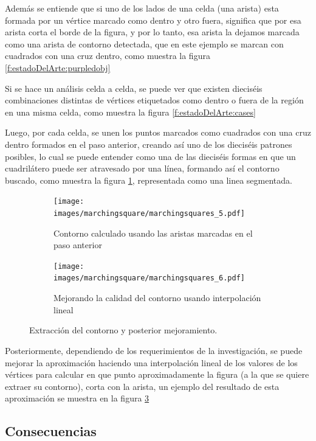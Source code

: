Además se entiende que si uno de los lados de una celda (una arista) esta formada por un
vértice marcado como dentro y otro fuera, significa que por esa arista corta el borde de la figura,
y por lo tanto, esa arista la dejamos marcada como una arista de contorno detectada, que en este
ejemplo se marcan con cuadrados con una cruz dentro, como muestra la figura \ref{f:estadoDelArte:purpledobj}

Si se hace un análisis celda a celda, se puede ver que existen dieciséis combinaciones distintas de
vértices etiquetados como dentro o fuera de la región en una misma celda, como muestra la figura
\ref{f:estadoDelArte:cases}

Luego, por cada celda, se unen los puntos marcados como cuadrados con una cruz dentro formados en el paso anterior, creando así uno de los dieciséis patrones posibles, lo cual se puede entender como una de las dieciséis formas en que un cuadrilátero puede ser atravesado por una línea, formando así el contorno buscado, como muestra la figura \ref{f:estadoDelArte:connectedobj}, representada como una linea segmentada.

\begin{figure}[t]

	\begin{subfigure}[t]{0.46\textwidth}
	\centering
		\texttt{[image: images/marchingsquare/marchingsquares\_5.pdf]}
	\caption{Contorno calculado usando las aristas marcadas en el paso anterior}
	\label{f:estadoDelArte:connectedobj}
	\end{subfigure}
	\quad
	\begin{subfigure}[t]{0.46\textwidth}
	\centering
		\texttt{[image: images/marchingsquare/marchingsquares\_6.pdf]}
	\caption{Mejorando la calidad del contorno usando interpolación lineal}
	\label{f:estadoDelArte:2Dintersected}
	\end{subfigure}

	\caption{Extracción del contorno y posterior mejoramiento.}

\end{figure}

Posteriormente, dependiendo de los requerimientos de la investigación, se puede mejorar
la aproximación haciendo una interpolación lineal de los valores de los vértices para calcular en
que punto aproximadamente la figura (a la que se quiere extraer su contorno), corta con la arista,
un ejemplo del resultado de esta aproximación se muestra en la figura \ref{f:estadoDelArte:2Dintersected}

\subsection{Consecuencias}
\label{subsec:marchingSquares:consecuencias}

